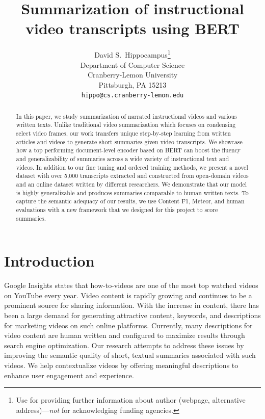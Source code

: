 \documentclass{article}
\title{Summarization of instructional video transcripts using BERT}
\author{%
  David S.~Hippocampus\thanks{Use  for providing further information
    about author (webpage, alternative address)---\emph{not} for acknowledging
    funding agencies.} \\
  Department of Computer Science\\
  Cranberry-Lemon University\\
  Pittsburgh, PA 15213 \\
  \texttt{hippo@cs.cranberry-lemon.edu} \\
}
\begin{document}
\maketitle

\begin{abstract}
In this paper, we study summarization of narrated instructional videos and various written texts. Unlike traditional video summarization which focuses on condensing select video frames, our work transfers unique step-by-step learning from written articles and videos to generate short summaries given video transcripts. We showcase how a top performing document-level encoder based on BERT can boost the fluency and generalizability of summaries across a wide variety of instructional text and videos. In addition to our fine tuning and ordered training methods, we present a novel dataset with over 5,000 transcripts extracted and constructed from open-domain videos and an online dataset written by different researchers. We demonstrate that our model is highly generalizable and produces summaries comparable to human written texts. To capture the semantic adequacy of our results, we use Content F1, Meteor, and human evaluations with a new framework that we designed for this project to score summaries.

\end{abstract}

\section{Introduction}
 
Google Insights states that how-to-videos are one of the most top watched videos on YouTube every year. Video content is rapidly growing and continues to be a prominent source for sharing information. With the increase in content, there has been a large demand for generating attractive content, keywords, and descriptions for marketing videos on such online platforms. Currently, many descriptions for video content are human written and configured to maximize results through search engine optimization. Our research attempts to address these issues by improving the semantic quality of short, textual summaries associated with such videos. We help contextualize videos by offering meaningful descriptions to enhance user engagement and experience.
\end{document}
